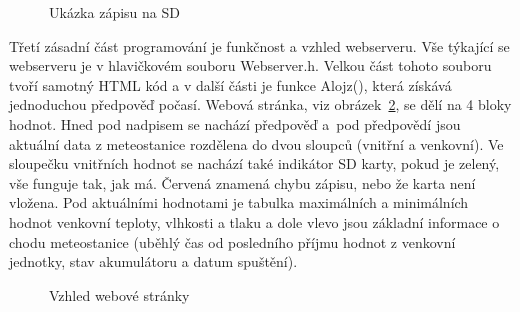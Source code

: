             \begin{figure}[htb]
            \caption{Ukázka zápisu na SD}
            \label{Zapis}
            \end{figure}

            Třetí zásadní část programování je funkčnost a vzhled webserveru. Vše týkající se webserveru je v hlavičkovém souboru Webserver.h. Velkou část tohoto souboru tvoří samotný HTML kód a v další části je funkce Alojz(), která získává jednoduchou předpověď počasí. Webová stránka, viz obrázek~\ref{obr:web}, se dělí na 4 bloky hodnot. Hned pod nadpisem se nachází předpověď a~pod předpovědí jsou aktuální data z meteostanice rozdělena do dvou sloupců (vnitřní a venkovní). Ve sloupečku vnitřních hodnot se nachází také indikátor SD karty, pokud je zelený, vše funguje tak, jak má. Červená znamená chybu zápisu, nebo že karta není vložena. Pod aktuálními hodnotami je tabulka maximálních a minimálních hodnot venkovní teploty, vlhkosti a tlaku a dole vlevo jsou základní informace o chodu meteostanice (uběhlý čas od posledního příjmu hodnot z venkovní jednotky, stav akumulátoru a datum spuštění).

            \begin{figure}[htb]
            \caption{Vzhled webové stránky}
            \label{obr:web}
            \end{figure}

        \clearpage